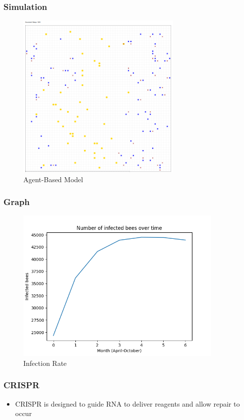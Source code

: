 \documentclass{beamer}
\begin{document}
\begin{frame}
  \frametitle{Simulation}
  \begin{figure}
    \centering
    \includegraphics[width=8cm]{bees_model_pic.png}
    \caption{Agent-Based Model}
    \label{Agent-Based Model}
    \centering
  \end{figure}
  

\end{frame}

\begin{frame}
  \frametitle{Graph}
  \begin{figure}
  \centering
    \includegraphics[width=10cm]{Figure_2.png}
    \caption{Infection Rate}
    \label{Infection Rate}
  \centering
  \end{figure}
\end{frame}

\begin{frame}
  \frametitle{CRISPR}
  \begin{itemize}
  \item CRISPR is designed to guide RNA to deliver reagents and allow repair to occur
  \end{itemize}
\end{frame}
\end{document}
